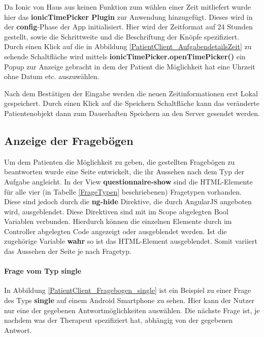 Da Ionic von Haus aus keinen Funktion zum wählen einer Zeit mitliefert wurde hier das \textbf{ionicTimePicker Plugin} zur Anwendung hinzugefügt. Dieses wird in der \textbf{config}-Phase der App initialisiert. Hier wird der Zeitformat auf 24 Stunden gestellt, sowie die Schrittweite und die Beschriftung der Knöpfe spezifiziert. Durch einen Klick auf die in Abbildung \ref{PatientClient_AufgabendetailsZeit} zu sehende Schaltfläche wird mittels \textbf{ionicTimePicker.openTimePicker()} ein Popup zur Anzeige gebracht in dem der Patient die Möglichkeit hat eine Uhrzeit ohne Datum etc. auszuwählen.

Nach dem Bestätigen der Eingabe werden die neuen Zeitinformationen erst Lokal gespeichert. Durch einen Klick auf die Speichern Schaltfläche kann das veränderte Patientenobjekt dann zum Dauerhaften Speichern an den Server gesendet werden.

\subsection{Anzeige der Fragebögen}\label{_ImpPCFragebogen}
Um dem Patienten die Möglichkeit zu geben, die gestellten Fragebögen zu beantworten wurde eine Seite entwickelt, die ihr Aussehen nach dem Typ der Aufgabe angleicht. In der View \textbf{questionnaire-show} sind die HTML-Elemente für alle vier (in Tabelle \ref{FrageTypen} beschriebenen) Fragetypen vorhanden. Diese sind jedoch durch die \textbf{ng-hide} Direktive, die durch AngularJS angeboten wird, ausgeblendet. Diese Direktiven sind mit im Scope abgelegten Bool Variablen verbunden. Hierdurch können die einzelnen Elemente durch im Controller abgelegten Code angezeigt oder ausgeblendet werden. Ist die zugehörige Variable \textbf{wahr} so ist das HTML-Element ausgeblendet. 
Somit variiert das Aussehen der Seite je nach Fragetyp.
\paragraph{Frage vom Typ single}
In Abbildung \ref{PatientClient_Fragebogen_single} ist ein Beispiel zu einer Frage des Typs \textbf{single} auf einem Android Smartphone zu sehen. Hier kann der Nutzer nur eine der gegebenen Antwortmöglichkeiten auswählen. Die nächste Frage ist, je nachdem was der Therapeut spezifiziert hat, abhängig von der gegebenen Antwort.


